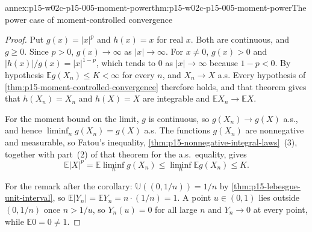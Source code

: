 \begin{annexitem}{annex:p15-w02c-p15-005-moment-power}{thm:p15-w02c-p15-005-moment-power}{The power case of moment-controlled convergence}
\begin{proof}
Put \(g(x)=|x|^p\) and \(h(x)=x\) for real \(x\). Both are continuous,
and \(g\geq0\). Since \(p>0\), \(g(x)\to\infty\) as \(|x|\to\infty\).
For \(x\neq0\), \(g(x)>0\) and
\(|h(x)|/g(x)=|x|^{1-p}\), which tends to \(0\) as \(|x|\to\infty\)
because \(1-p<0\). By hypothesis \(\mathbb Eg(X_n)\leq K<\infty\) for
every \(n\), and \(X_n\to X\) a.s. Every hypothesis of
\cref{thm:p15-moment-controlled-convergence} therefore holds, and that
theorem gives that \(h(X_n)=X_n\) and \(h(X)=X\) are integrable and
\(\mathbb EX_n\to\mathbb EX\).

For the moment bound on the limit, \(g\) is continuous, so
\(g(X_n)\to g(X)\) a.s., and hence \(\liminf_ng(X_n)=g(X)\) a.s. The
functions \(g(X_n)\) are nonnegative and measurable, so Fatou's
inequality, \cref{thm:p15-nonnegative-integral-laws}~(3), together with
part~(2) of that theorem for the a.s.\ equality, gives
\[
 \mathbb E|X|^p=\mathbb E\liminf_ng(X_n)\leq\liminf_n\mathbb Eg(X_n)
 \leq K .
\]

For the remark after the corollary: \(\mathbb U((0,1/n))=1/n\) by
\cref{thm:p15-lebesgue-unit-interval}, so
\(\mathbb E|Y_n|=\mathbb EY_n=n\cdot(1/n)=1\). A point
\(u\in(0,1)\) lies outside \((0,1/n)\) once \(n>1/u\), so
\(Y_n(u)=0\) for all large \(n\) and \(Y_n\to0\) at every point, while
\(\mathbb E0=0\neq1\).
\end{proof}
\end{annexitem}

